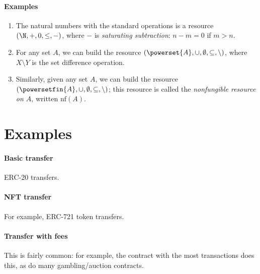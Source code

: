 \documentclass[10pt]{article}
\begin{document}
\paragraph{Examples}

\begin{enumerate}
    \item The natural numbers with the standard operations is a resource $(\N, +, 0, \leq, -)$, where $-$ is \emph{saturating subtraction}: $n - m = 0$ if $m > n$.
    \item For any set $A$, we can build the resource $(\powerset{A}, \cup, \emptyset, \subseteq, \setminus)$, where $X \setminus Y$ is the set difference operation.
    \item Similarly, given any set $A$, we can build the resource $(\powersetfin{A}, \cup, \emptyset, \subseteq, \setminus)$; this resource is called the \emph{nonfungible resource on $A$}, written $\text{nf}(A)$.
\end{enumerate}

\section{Examples}
\paragraph{Basic transfer} ERC-20 transfers.

\paragraph{NFT transfer}
For example, ERC-721 token transfers.


\paragraph{Transfer with fees}
This is fairly common: for example, the contract with the most transactions does this, as do many gambling/auction contracts.
\end{document}

